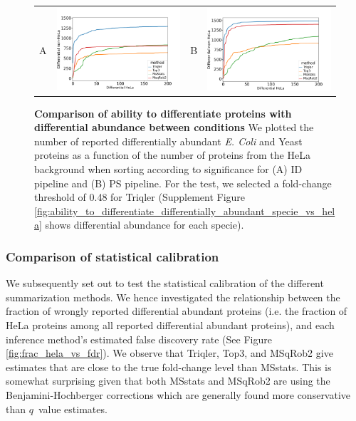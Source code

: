 \documentclass[10pt,letterpaper]{article}
\begin{document}
\begin{figure}[hbt]
    \centering
    \begin{tabular}{lclc} 
        A & \includegraphics[width=0.45\linewidth]{../../result/report_plots_pipeline/diff_HeLa_vs_nonHeLa_ID_all.png} & 
        B & \includegraphics[width=0.45\linewidth]{../../result/report_plots_pipeline/diff_HeLa_vs_nonHeLa_PS_all.png} \\
    \end{tabular} 
    \caption{{\bf Comparison of ability to differentiate proteins with differential abundance between conditions} We plotted the number of reported differentially abundant  {\em E. Coli} and Yeast proteins as a function of the number of proteins from the HeLa background when sorting according to significance for (A) ID pipeline and (B) PS pipeline. For the test, we selected a fold-change threshold of 0.48 for Triqler (Supplement Figure \ref{fig:ability_to_differentiate_differentially_abundant_specie_vs_hela} shows differential abundance for each specie). \label{fig:diff_vs_hela}}
\end{figure}

\subsubsection*{Comparison of statistical calibration}

We subsequently set out to test the statistical calibration of the different summarization methods. We hence investigated the relationship between the fraction of wrongly reported differential abundant proteins (i.e. the fraction of HeLa proteins among all reported differential abundant proteins), and each inference method's estimated false discovery rate (See Figure \ref{fig:frac_hela_vs_fdr}). We observe that Triqler, Top3, and MSqRob2 give estimates that are close to the true fold-change level than MSstats. This is somewhat surprising given that both MSstats and MSqRob2 are using the Benjamini-Hochberger corrections which are generally found more conservative than $q$~value estimates.
\end{document}

